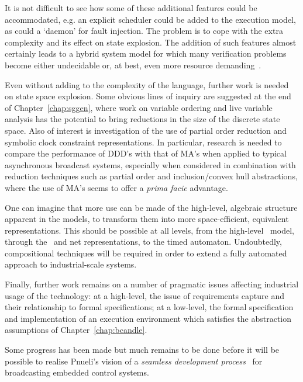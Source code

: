 It is not difficult to see how some of these additional features could
be accommodated, e.g. an explicit scheduler could be added to the
execution model, as could a `daemon' for fault injection. The problem
is to cope with the extra complexity and its effect on state
explosion. The addition of such features almost certainly leads to a
hybrid system model for which many verification problems become either
undecidable or, at best, even more resource demanding~\cite{hkpv:95}.
 
Even without adding to the complexity of the language, further work is
needed on state space explosion. Some obvious lines of inquiry are
suggested at the end of Chapter~\ref{chap:sggen}, where work on
variable ordering and live variable analysis has the potential to
bring reductions in the size of the discrete state space. Also of
interest is investigation of the use of partial order reduction
and symbolic clock constraint representations.  In particular, research
is needed to compare the performance of DDD's with that of
MA's when applied to typical asynchronous broadcast systems,
especially when considered in combination with reduction techniques
such as partial order and inclusion/convex hull abstractions, where
the use of MA's seems to offer a \emph{prima facie} advantage.

One can imagine that more use can be made of the high-level, algebraic
structure apparent in the models, to transform them into more
space-efficient, equivalent representations. This should be possible
at all levels, from the high-level \candle\ model, through the
\bcandle\ and net representations, to the timed automaton.
Undoubtedly, compositional techniques will be required in order to extend a
fully automated approach to industrial-scale systems. 

Finally, further work remains on a number of pragmatic issues
affecting industrial usage of the technology: at a high-level, the
issue of requirements capture and their relationship to formal
specifications; at a low-level, the formal specification and
implementation of an execution environment which satisfies the
abstraction assumptions of Chapter~\ref{chap:bcandle}.  

Some progress has been made but much remains to be done before it will
be possible to realise Pnueli's vision of a \emph{seamless development
process}~\cite{pnu:99} for broadcasting embedded control systems.


 

